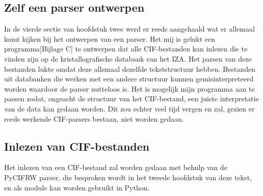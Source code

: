 \subsection{Zelf een parser ontwerpen}
In de vierde sectie van hoofdstuk twee werd er reeds aangehaald wat er allemaal komt kijken bij het ontwerpen van een parser. Het mij is gelukt een programma[Bijlage C] te ontwerpen dat alle CIF-bestanden kan inlezen die te vinden zijn op de kristallografische databank van het IZA.\citep*{IZA1} Het parsen van deze bestanden lukte omdat deze allemaal dezelfde tekststructuur hebben. Bestanden uit databanken die werken met een andere structuur kunnen gemisinterpreteerd worden waardoor de parser nutteloos is. Het is mogelijk mijn programma aan te passen zodat, ongeacht de structuur van het CIF-bestand, een juiste interpretatie van de data kan gedaan worden. Dit zou echter veel tijd vergen en zal, gezien er reeds werkende CIF-parsers bestaan, niet worden gedaan.

\subsection{Inlezen van CIF-bestanden}
Het inlezen van een CIF-bestand zal worden gedaan met behulp van de PyCIFRW parser, die besproken wordt in het tweede hoofdstuk van deze tekst, en als module kan worden gebruikt in Python.





